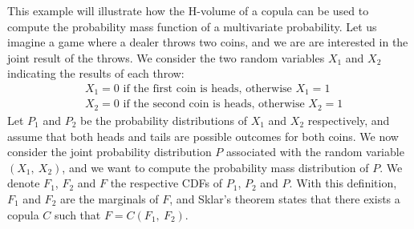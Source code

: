 \begin{example}\label{ex:hvolume}
    This example will illustrate how the H-volume of a copula can be used to compute the probability mass function of a multivariate probability. Let us imagine a game where a dealer throws two coins, and we are are interested in the joint result of the throws. We consider the two random variables $X_1$ and $X_2$ indicating the results of each throw:
    \begin{align*}
        &X_1=0\text{ if the first coin is heads, otherwise }X_1=1\\
        &X_2=0\text{ if the second coin is heads, otherwise }X_2=1
    \end{align*}
    Let $P_1$ and $P_2$ be the probability distributions of $X_1$ and $X_2$ respectively, and assume that both heads and tails are possible outcomes for both coins. We now consider the joint probability distribution $P$ associated with the random variable $(X_1,~X_2)$, and we want to compute the probability mass distribution of $P$. We denote $F_1$, $F_2$ and $F$ the respective CDFs of $P_1$, $P_2$ and $P$. With this definition, $F_1$ and $F_2$ are the marginals of $F$, and Sklar's theorem states that there exists a copula $C$ such that $F=C(F_1,~F_2)$. 
    

\end{example}
